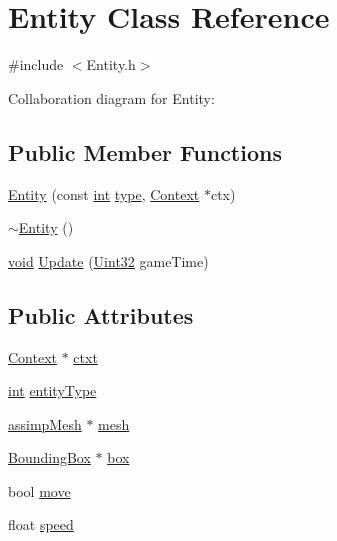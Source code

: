 \hypertarget{class_entity}{\section{Entity Class Reference}
\label{class_entity}
}


{\ttfamily \#include $<$Entity.\-h$>$}



Collaboration diagram for Entity\-:
\subsection*{Public Member Functions}
\begin{DoxyCompactItemize}
\item 
\hyperlink{class_entity_a4f15b363a898d971ff97856f05b042c2}{Entity} (const \hyperlink{_s_d_l__thread_8h_a6a64f9be4433e4de6e2f2f548cf3c08e}{int} \hyperlink{_g_l_e_w_2glew_8h_a7d05960f4f1c1b11f3177dc963a45d86}{type}, \hyperlink{class_context}{Context} $\ast$ctx)
\item 
\hyperlink{class_entity_adf6d3f7cb1b2ba029b6b048a395cc8ae}{$\sim$\-Entity} ()
\item 
\hyperlink{_s_d_l__opengl_8h_a3db05964a3cc4410f35b7ea2b7eb850d}{void} \hyperlink{class_entity_af87d92f23623d0a7e0d663222ae801c0}{Update} (\hyperlink{_s_d_l__stdinc_8h_add440eff171ea5f55cb00c4a9ab8672d}{Uint32} game\-Time)
\end{DoxyCompactItemize}
\subsection*{Public Attributes}
\begin{DoxyCompactItemize}
\item 
\hyperlink{class_context}{Context} $\ast$ \hyperlink{class_entity_abfdb0e47275191119d445f868fda66dd}{ctxt}
\item 
\hyperlink{_s_d_l__thread_8h_a6a64f9be4433e4de6e2f2f548cf3c08e}{int} \hyperlink{class_entity_ac8f79ba45e199ebfead685eb61787c00}{entity\-Type}
\item 
\hyperlink{classassimp_mesh}{assimp\-Mesh} $\ast$ \hyperlink{class_entity_a59fc8989c8317562a370c6d681f186ed}{mesh}
\item 
\hyperlink{class_bounding_box}{Bounding\-Box} $\ast$ \hyperlink{class_entity_aba343b718e9fdd8d27041bebc7bc5885}{box}
\item 
bool \hyperlink{class_entity_aa7c25fb47375d3d50235f11a53666981}{move}
\item 
float \hyperlink{class_entity_a1de3d8d9ab8088f61e6726069b26fa60}{speed}
\end{DoxyCompactItemize}


